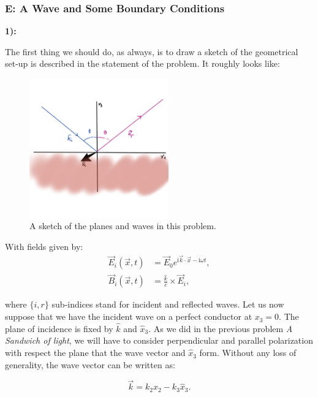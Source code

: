 \subsubsection{E: A Wave and Some Boundary Conditions}\label{E: A Wave and Some Boundary Conditions}

\textbf{1):}

The first thing we should do, as always, is to draw a sketch of the geometrical set-up is described in the statement of the problem. It roughly looks like:
	
\begin{figure}[h!]
	\includegraphics[width=6cm]{figures/X3plane.png}
	\centering
	\caption{A sketch of the planes and waves in this problem.}
\end{figure}
	
With fields given by:
\begin{subequations}
	\begin{align}
		\vec{E}_{i}(\vec{x}, t)&=\vec{E}_{0} e^{\mathrm{i} \vec{k} \cdot \vec{x}-\mathrm{i} \omega t} ,\\
		\vec{B}_{i}(\vec{x}, t)&=\frac{\hat{k}}{c} \times \vec{E}_{i},
	\end{align}
\end{subequations}

where $\{i,r\}$ sub-indices stand for incident and reflected waves. Let us now suppose that we have the incident wave on a perfect conductor at $x_{3}=0$. The plane of incidence is fixed by $\hat{k}$ and $\hat{x}_{3}$. As we did in the previous problem \textit{A Sandwich of light}, we will have to consider perpendicular and parallel polarization with respect the plane that the wave vector and $\hat{x}_{3}$ form. Without any loss of generality, the wave vector can be written as:
	
\begin{equation}
	\vec{k} = k_{2} \hat{x}_{2} - k_{3}\hat{x}_{3}.
\end{equation}

